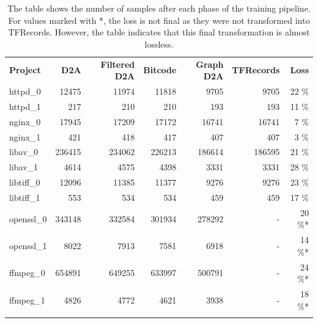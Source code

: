 \begin{table}
    \centering
    \caption{The table shows the number of samples after each phase of the training pipeline. For values marked with *, the loss is not final as they were not transformed into TFRecords. However, the table indicates that this final transformation is almost lossless.}
    \vskip6pt
    \begin{tabular}{!{\vrule width 1pt}l!{\vrule width 1pt}r|r|r|r|r!{\vrule width 1pt}r!{\vrule width 1pt}}
        {\small \textbf{Project}} & {\small \textbf{D2A}} & {\small \textbf{Filtered D2A}} & {\small \textbf{Bitcode}} & {\small \textbf{Graph D2A}} & {\small \textbf{TFRecords}} & {\small \textbf{Loss}} \\
        httpd\_0 & 12475 & 11974 & 11818 & 9705 & 9705 & 22 \% \\ \hline
        httpd\_1 & 217 & 210 & 210 & 193 & 193 & 11 \% \\ \hline
        nginx\_0 & 17945 & 17209 & 17172 & 16741 & 16741 & 7 \% \\ \hline
        nginx\_1 & 421 & 418 & 417 & 407 & 407 & 3 \% \\ \hline
        libav\_0 & 236415 & 234062 & 226213 & 186614 & 186595 & 21 \% \\ \hline
        libav\_1 & 4614 & 4575 & 4398 & 3331 & 3331 & 28 \% \\ \hline
        libtiff\_0 & 12096 & 11385 & 11377 & 9276 & 9276 & 23 \% \\ \hline
        libtiff\_1 & 553 & 534 & 534 & 459 & 459 & 17 \% \\ \hline
        openssl\_0 & 343148 & 332584 & 301934 &  278292 & - & 20 \%* \\ \hline
        openssl\_1 & 8022 & 7913 & 7581 & 6918 & - & 14 \%* \\ \hline
        ffmpeg\_0 & 654891 & 649255 & 633997 & 500791 & - & 24 \%* \\ \hline
        ffmpeg\_1 & 4826 & 4772 & 4621 & 3938 & - & 18 \%* \\ \hline
    \end{tabular}
    \label{tab:implementation-d2a}
\end{table}


